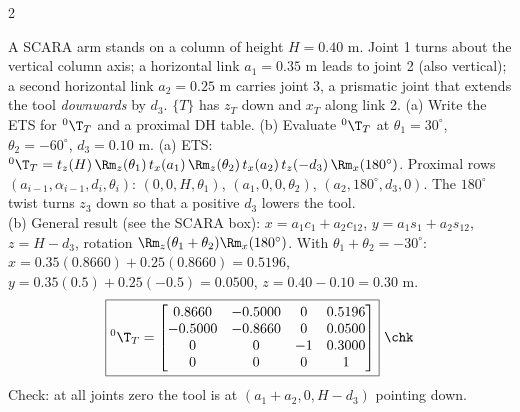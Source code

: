 \begin{multicols}{2}
\begin{examq}
A SCARA arm stands on a column of height $H=0.40$ m. Joint 1 turns about the vertical column axis; a horizontal link $a_1=0.35$ m leads to joint 2 (also vertical); a second horizontal link $a_2=0.25$ m carries joint 3, a prismatic joint that extends the tool \emph{downwards} by $d_3$. $\{T\}$ has $z_T$ down and $x_T$ along link 2. (a) Write the ETS for ${}^0\T_T$ and a proximal DH table. (b) Evaluate ${}^0\T_T$ at $\theta_1=30^\circ$, $\theta_2=-60^\circ$, $d_3=0.10$ m.
\solution
(a) ETS: ${}^0\T_T=t_z(H)\,\Rm_z(\theta_1)\,t_x(a_1)\,\Rm_z(\theta_2)\,t_x(a_2)\,t_z(-d_3)\,\Rm_x(180^\circ)$. Proximal rows $(a_{i-1},\alpha_{i-1},d_i,\theta_i)$: $(0,0,H,\theta_1)$, $(a_1,0,0,\theta_2)$, $(a_2,180^\circ,d_3,0)$. The $180^\circ$ twist turns $z_3$ down so that a positive $d_3$ lowers the tool.\\
(b) General result (see the SCARA box): $x=a_1c_1+a_2c_{12}$, $y=a_1s_1+a_2s_{12}$, $z=H-d_3$, rotation $\Rm_z(\theta_1+\theta_2)\Rm_x(180^\circ)$. With $\theta_1+\theta_2=-30^\circ$: $x=0.35(0.8660)+0.25(0.8660)=0.5196$, $y=0.35(0.5)+0.25(-0.5)=0.0500$, $z=0.40-0.10=0.30$ m.
\[\boxed{{}^0\T_T=\begin{bmatrix}0.8660&-0.5000&0&0.5196\\-0.5000&-0.8660&0&0.0500\\0&0&-1&0.3000\\0&0&0&1\end{bmatrix}}\ \chk\]
Check: at all joints zero the tool is at $(a_1{+}a_2,0,H-d_3)$ pointing down.
\end{examq}


\end{multicols}
